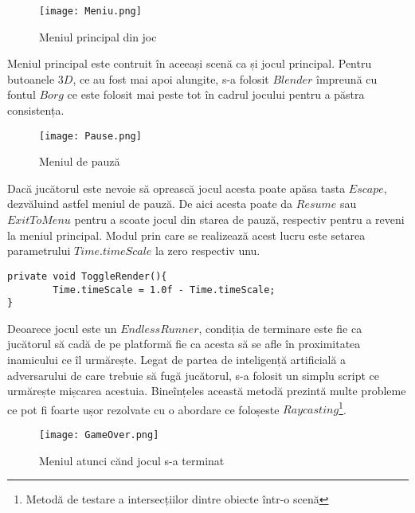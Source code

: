 \vspace{10mm}
\begin{figure}[H]
\centering
\texttt{[image: Meniu.png]} \par
\caption{Meniul principal din joc}
\end{figure}

Meniul principal este contruit în aceeași scenă ca și jocul principal. Pentru butoanele $3D$, ce au fost mai apoi alungite, s-a folosit $Blender$ împreună cu fontul $Borg$ ce este folosit mai peste tot în cadrul jocului pentru a păstra consistența.\par

\vspace{10mm}
\begin{figure}[H]
\centering
\texttt{[image: Pause.png]} \par
\caption{Meniul de pauză}
\end{figure}

Dacă jucătorul este nevoie să oprească jocul acesta poate apăsa tasta $Escape$, dezvăluind astfel meniul de pauză. De aici acesta poate da $Resume$ sau $Exit To Menu$ pentru a scoate jocul din starea de pauză, respectiv pentru a reveni la meniul principal. Modul prin care se realizează acest lucru este setarea parametrului $Time.timeScale$ la zero respectiv unu.\par

\begin{lstlisting}[caption=Exemplu de folosire a $Time.timeScale$]
private void ToggleRender(){
        Time.timeScale = 1.0f - Time.timeScale;
}
\end{lstlisting}

Deoarece jocul este un $EndlessRunner$, condiția de terminare este fie ca jucătorul să cadă de pe platformă fie ca acesta să se afle în proximitatea inamicului ce îl urmărește. Legat de partea de inteligență artificială a adversarului de care trebuie să fugă jucătorul, s-a folosit un simplu script ce urmărește mișcarea acestuia. Bineînțeles această metodă prezintă multe probleme ce pot fi foarte ușor rezolvate cu o abordare ce foloșeste $Raycasting$\footnote{Metodă de testare a intersecțiilor dintre obiecte într-o scenă}.\par

\vspace{10mm}
\begin{figure}[H]
\centering
\texttt{[image: GameOver.png]} \par
\caption{Meniul atunci cănd jocul s-a terminat}
\end{figure}

